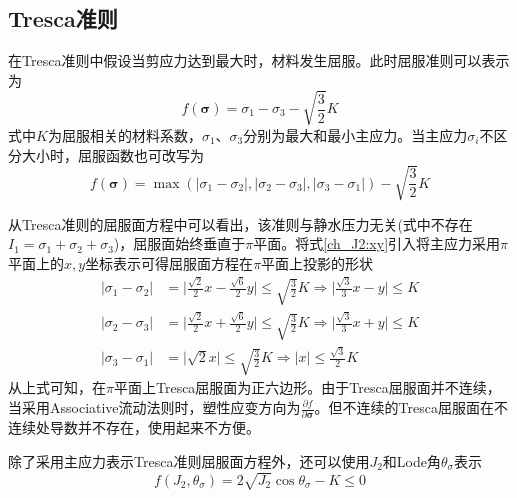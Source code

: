 \subsection{Tresca准则}
在Tresca准则中假设当剪应力达到最大时，材料发生屈服。此时屈服准则可以表示为
\begin{equation}
    f(\boldsymbol \sigma) = \sigma_1-\sigma_3 - \sqrt{\frac{3}{2}}K
\end{equation}
式中$K$为屈服相关的材料系数，$\sigma_1$、$\sigma_3$分别为最大和最小主应力。当主应力$\sigma_i$不区分大小时，屈服函数也可改写为
\begin{equation}
    f(\boldsymbol \sigma) = \max(\vert \sigma_1 - \sigma_2 \vert, \vert \sigma_2 - \sigma_3 \vert, \vert \sigma_3 - \sigma_1 \vert) - \sqrt{\frac{3}{2}}K
\end{equation} \par
从Tresca准则的屈服面方程中可以看出，该准则与静水压力无关(式中不存在$I_1=\sigma_1+\sigma_2+\sigma_3$)，屈服面始终垂直于$\pi$平面。将式\eqref{ch_J2:xy}引入将主应力采用$\pi$平面上的$x,y$坐标表示可得屈服面方程在$\pi$平面上投影的形状
\begin{subequations}
    \begin{align}
        \vert \sigma_1 - \sigma_2 \vert &= \Big \vert \frac{\sqrt 2}{2}x - \frac{\sqrt 6}{2}y \Big \vert \le \sqrt{\frac{3}{2}}K \Rightarrow \Big \vert \frac{\sqrt 3}{3} x - y \big \vert \le K \\
        \vert \sigma_2 - \sigma_3 \vert &= \Big \vert \frac{\sqrt 2}{2}x + \frac{\sqrt 6}{2}y \Big \vert \le \sqrt{\frac{3}{2}}K \Rightarrow \Big \vert \frac{\sqrt 3}{3} x + y \big \vert \le K \\
        \vert \sigma_3 - \sigma_1 \vert &= \vert \sqrt 2x \vert \le \sqrt{\frac{3}{2}}K \Rightarrow \vert x \vert \le \frac{\sqrt 3}{2}K 
    \end{align}
\end{subequations}
从上式可知，在$\pi$平面上Tresca屈服面为正六边形。由于Tresca屈服面并不连续，当采用Associative流动法则时，塑性应变方向为$\frac{\partial f}{\partial \boldsymbol \sigma}$。但不连续的Tresca屈服面在不连续处导数并不存在，使用起来不方便。\par
除了采用主应力表示Tresca准则屈服面方程外，还可以使用$J_2$和Lode角$\theta_\sigma$表示
\begin{equation}
    f(J_2,\theta_\sigma)=2\sqrt{J_2}\cos \theta_\sigma - K \le 0
\end{equation}

